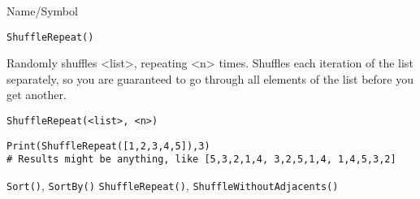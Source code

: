 \begin{desc}{Name/Symbol}
\item[Name/Symbol] 	\verb+ShuffleRepeat()+

\item[Description] 	Randomly shuffles  <list>, repeating <n> times.  Shuffles
  each iteration of the list separately, so you are guaranteed to go
  through all elements of the list before you get another.

\item[Usage]    
\begin{verbatim}
ShuffleRepeat(<list>, <n>)
\end{verbatim}

\item[Example]
\begin{verbatim}
Print(ShuffleRepeat([1,2,3,4,5]),3)
# Results might be anything, like [5,3,2,1,4, 3,2,5,1,4, 1,4,5,3,2]
\end{verbatim}

\item[See Also]    	\verb+Sort()+, \verb+SortBy()+ \verb+ShuffleRepeat()+,
                    \verb+ShuffleWithoutAdjacents()+
\end{desc}

\rl



